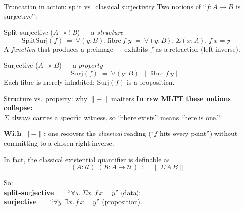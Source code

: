 \documentclass[aspectratio=169,12pt]{beamer}
\newcommand{\trunc}[1]{\lVert #1 \rVert}
\begin{document}
\begin{frame}{Truncation in action: split vs.\ classical surjectivity}
  Two notions of ``$f : A \to B$ is surjective'':
  \pause\medskip

  \begin{block}{Split-surjective ($A \twoheadrightarrow ! \ B$) --- a \emph{structure}}
    \[
      \mathrm{SplitSurj}(f) \;=\; \forall(y : B).\; \mathrm{fibre}\;f\;y
      \;=\; \forall(y : B).\; \Sigma(x : A).\; f\;x = y
    \]
    A \emph{function} that produces a preimage --- exhibits $f$ as a retraction
    (left inverse).
  \end{block}
  \pause

  \begin{block}{Surjective ($A \twoheadrightarrow B$) --- a \emph{property}}
    \[
      \mathrm{Surj}(f) \;=\; \forall(y : B).\; \trunc{\mathrm{fibre}\;f\;y}
    \]
    Each fibre is merely inhabited; $\mathrm{Surj}(f)$ is a proposition.
  \end{block}
\end{frame}

\begin{frame}{Structure vs.\ property: why $\trunc{-}$ matters}
  \textbf{In raw MLTT these notions collapse:} \\
  $\Sigma$ always carries a specific witness, so ``there exists''
  means ``here is one.''
  \pause\medskip

  \textbf{With $\trunc{-}$:} one recovers the \emph{classical} reading
  (``$f$ hits every point'') without committing to a chosen right inverse.
  \pause\medskip

  In fact, the classical existential quantifier is definable as
  \[
    \exists (A : \mathcal{U})\;(B : A \to \mathcal{U}) \;:=\; \trunc{\Sigma\,A\,B}
  \]
  \pause\medskip

  So:\\
  \textbf{split-surjective} $=$ ``$\forall y.\ \Sigma x.\ f\,x = y$'' (data); \\
  \textbf{surjective} $=$ ``$\forall y.\ \exists x.\ f\,x = y$'' (proposition).
\end{frame}
\end{document}
